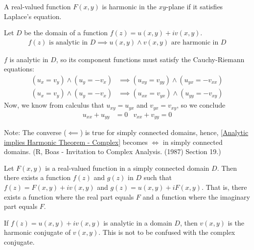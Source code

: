 \documentclass[12pt, english]{book}
\makeatletter
\renewenvironment{proof}[1][\proofname]{\par
	\pushQED{\qed}%
	\normalfont \topsep6\p@\@plus6\p@\relax
	\list{}{%
		\settowidth{\leftmargin}{\itshape\proofname:\hskip\labelsep}%
		\setlength{\labelwidth}{0pt}%
		\setlength{\itemindent}{-\leftmargin}%
	}%
	\item[\hskip\labelsep\itshape#1\@addpunct{:}]\ignorespaces
}{%
	\popQED\endlist\@endpefalse
}
\makeatother
\begin{document}
	\begin{definition}[Harmonic]
		A real-valued function \(F(x,y)\) is harmonic in the \(xy\)-plane if it satisfies Laplace's equation.
	\end{definition}

	\begin{theorem}
		\label{Analytic implies Harmonic Theorem - Complex}
		Let \(D\) be the domain of a function \(f(z) = u(x,y) + iv(x,y)  \).
		\begin{align*}
			f(z) \text{ is analytic in } D \implies u(x,y) \land v(x,y) \text{ are harmonic in } D
		\end{align*}
	\end{theorem}
	\begin{proof}
		\(f\) is analytic in \(D\), so its component functions must satisfy the Cauchy-Riemann equations: 
		\begin{align*}
			(u_x = v_y)\land(u_y = -v_x) 
				&\implies (u_{xy} = v_{yy})\land(u_{yx} = -v_{xx})  \\
			(u_x = v_y)\land(u_y = -v_x) 
				&\implies (u_{xx} = v_{yx})\land(u_{yy} = -v_{xy}) 
		\end{align*}
		Now, we know from calculus that \(u_{xy} = u_{yx}\) and \(v_{yx} = v_{xy}\), so we conclude
		\begin{align*}
			u_{xx} + u_{yy} &= 0 & v_{xx} + v_{yy} = 0
		\end{align*}
	\end{proof}

	Note: The converse (\(\impliedby\)) is true for simply connected domains, hence, \cref{Analytic implies Harmonic Theorem - Complex} becomes \(\iff\) in simply connected domains. (R, Boas - Invitation to Complex Analysis. (1987) Section 19.)
	
	\begin{corollary}
		Let \(F(x,y)\) is a real-valued function in a simply connected domain \(D\). Then there exists a function \(f(z)\) and \(g(z)\) in \(D\) such that \(f(z) = F(x,y) + iv(x,y)\) and \(g(z) = u(x,y) + iF(x,y)\). That is, there exists a function where the real part equals \(F\) and a function where the imaginary part equals \(F\).
	\end{corollary}

	\begin{definition}
		\label{Harmonic Conjugate Definition - Complex}
		If \(f(z) = u(x,y) + iv(x,y)\) is analytic in a domain \(D\), then \(v(x,y)\) is the harmonic conjugate of \(v(x,y)\). This is not to be confused with the complex conjugate.
	\end{definition}
	
\end{document}
